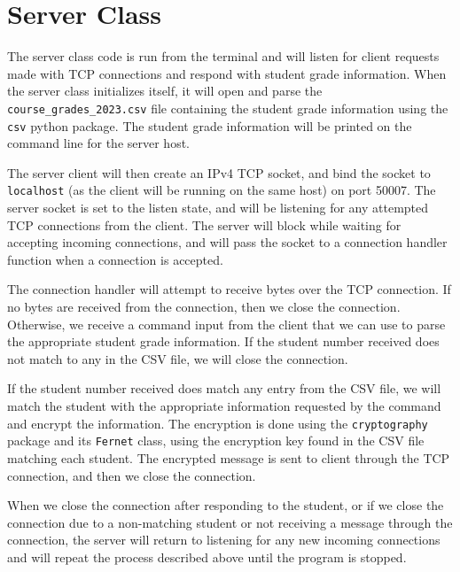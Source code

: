 \section*{Server Class}
The server class code is run from the terminal and will listen for client requests made with TCP connections and respond with student grade information. When the server class initializes itself, it will open and parse the \texttt{course\_grades\_2023.csv} file containing the student grade information using the \texttt{csv} python package. The student grade information will be printed on the command line for the server host.

The server client will then create an IPv4 TCP socket, and bind the socket to \texttt{localhost} (as the client will be running on the same host) on port 50007. The server socket is set to the listen state, and will be listening for any attempted TCP connections from the client. The server will block while waiting for accepting incoming connections, and will pass the socket to a connection handler function when a connection is accepted.

The connection handler will attempt to receive bytes over the TCP connection. If no bytes are received from the connection, then we close the connection. Otherwise, we receive a command input from the client that we can use to parse the appropriate student grade information. If the student number received does not match to any in the CSV file, we will close the connection. 

If the student number received does match any entry from the CSV file, we will match the student with the appropriate information requested by the command and encrypt the information. The encryption is done using the \texttt{cryptography} package and its \texttt{Fernet} class, using the encryption key found in the CSV file matching each student. The encrypted message is sent to client through the TCP connection, and then we close the connection.

When we close the connection after responding to the student, or if we close the connection due to a non-matching student or not receiving a message through the connection, the server will return to listening for any new incoming connections and will repeat the process described above until the program is stopped.
